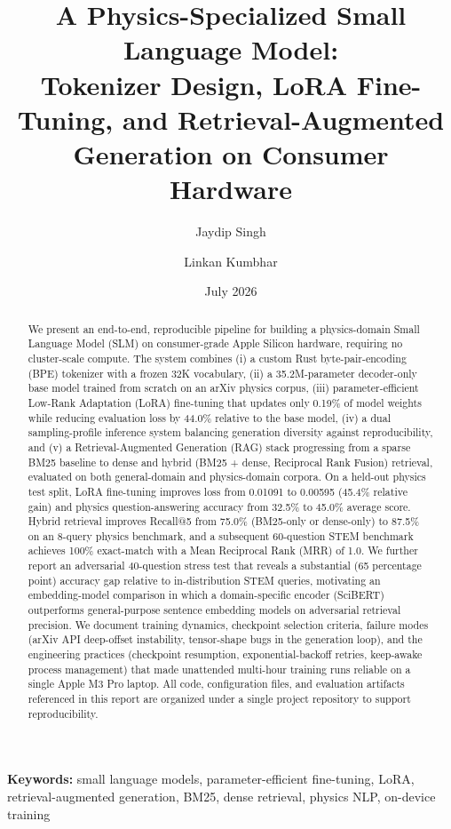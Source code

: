 \documentclass[11pt]{article}
\title{\textbf{A Physics-Specialized Small Language Model: \\
Tokenizer Design, LoRA Fine-Tuning, and Retrieval-Augmented \\
Generation on Consumer Hardware}}
\author[1]{Jaydip Singh}
\author[1]{Linkan Kumbhar}
\affil[1]{Independent Research}
\date{July 2026}
\begin{document}
\maketitle

\begin{abstract}
We present an end-to-end, reproducible pipeline for building a physics-domain
Small Language Model (SLM) on consumer-grade Apple Silicon hardware, requiring
no cluster-scale compute. The system combines (i) a custom Rust byte-pair-encoding
(BPE) tokenizer with a frozen 32K vocabulary, (ii) a 35.2M-parameter decoder-only
base model trained from scratch on an arXiv physics corpus, (iii) parameter-efficient
Low-Rank Adaptation (LoRA) fine-tuning that updates only 0.19\% of model weights
while reducing evaluation loss by 44.0\% relative to the base model, (iv) a
dual sampling-profile inference system balancing generation diversity against
reproducibility, and (v) a Retrieval-Augmented Generation (RAG) stack progressing
from a sparse BM25 baseline to dense and hybrid (BM25 + dense, Reciprocal Rank
Fusion) retrieval, evaluated on both general-domain and physics-domain corpora.
On a held-out physics test split, LoRA fine-tuning improves loss from 0.01091
to 0.00595 (45.4\% relative gain) and physics question-answering accuracy from
32.5\% to 45.0\% average score. Hybrid retrieval improves Recall@5 from 75.0\%
(BM25-only or dense-only) to 87.5\% on an 8-query physics benchmark, and a
subsequent 60-question STEM benchmark achieves 100\% exact-match with a Mean
Reciprocal Rank (MRR) of 1.0. We further report an adversarial 40-question
stress test that reveals a substantial (65 percentage point) accuracy gap
relative to in-distribution STEM queries, motivating an embedding-model
comparison in which a domain-specific encoder (SciBERT) outperforms
general-purpose sentence embedding models on adversarial retrieval precision.
We document training dynamics, checkpoint selection criteria, failure modes
(arXiv API deep-offset instability, tensor-shape bugs in the generation loop),
and the engineering practices (checkpoint resumption, exponential-backoff
retries, keep-awake process management) that made unattended multi-hour
training runs reliable on a single Apple M3 Pro laptop. All code, configuration
files, and evaluation artifacts referenced in this report are organized under
a single project repository to support reproducibility.
\end{abstract}

\noindent\textbf{Keywords:} small language models, parameter-efficient fine-tuning,
LoRA, retrieval-augmented generation, BM25, dense retrieval, physics NLP,
on-device training
\end{document}

